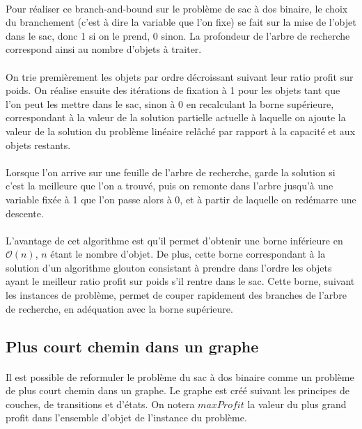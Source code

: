\documentclass[12pt]{article}
\begin{document}
\paragraph{}Pour réaliser ce branch-and-bound sur le problème de sac à dos binaire, le choix du branchement (c'est à dire la variable que l'on fixe) se fait sur la mise de l'objet dans le sac, donc 1 si on le prend, 0 sinon. La profondeur de l'arbre de recherche correspond ainsi au nombre d'objets à traiter.

\paragraph{}On trie premièrement les objets par ordre décroissant suivant leur ratio profit sur poids. On réalise ensuite des itérations de fixation à 1 pour les objets tant que l'on peut les mettre dans le sac, sinon à 0 en recalculant la borne supérieure, correspondant à la valeur de la solution partielle actuelle à laquelle on ajoute la valeur de la solution du problème linéaire relâché par rapport à la capacité et aux objets restants.

\paragraph{}Lorsque l'on arrive sur une feuille de l'arbre de recherche, garde la solution si c'est la meilleure que l'on a trouvé, puis on remonte dans l'arbre jusqu'à une variable fixée à 1 que l'on passe alors à 0, et à partir de laquelle on redémarre une descente.

\paragraph{}L'avantage de cet algorithme est qu'il permet d'obtenir une borne inférieure en $\mathcal{O}(n)$, $n$ étant le nombre d'objet. De plus, cette borne correspondant à la solution d'un algorithme glouton consistant à prendre dans l'ordre les objets ayant le meilleur ratio profit sur poids s'il rentre dans le sac. Cette borne, suivant les instances de problème, permet de couper rapidement des branches de l'arbre de recherche, en adéquation avec la borne supérieure.

\subsection{Plus court chemin dans un graphe}

\paragraph{}Il est possible de reformuler le problème du sac à dos binaire comme un problème de plus court chemin dans un graphe. Le graphe est créé suivant les principes de couches, de transitions et d'états. On notera $maxProfit$ la valeur du plus grand profit dans l'ensemble d'objet de l'instance du problème.
\end{document}
